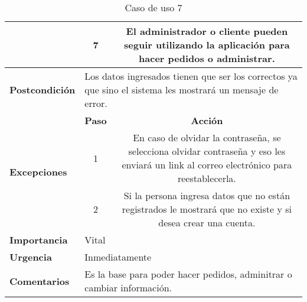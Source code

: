 \documentclass[conference]{IEEEtran}
\begin{document}
\begin{table}[H]
\begin{adjustbox}{width=0.45\textwidth}
\begin{tabular}{|p{11.215em}|p{5.355em}|c|}
\cmidrule{2-3}    \multicolumn{1}{|c|}{} & \multicolumn{1}{c|}{7} & \multicolumn{1}{p{32em}|}{El administrador o cliente pueden seguir utilizando la aplicación para hacer pedidos o administrar.} \\
    \midrule
    \textbf{Postcondición} & \multicolumn{2}{p{37.355em}|}{Los datos ingresados tienen que ser los correctos ya que sino el sistema les mostrará un mensaje de error.} \\
    \midrule
    \multirow{4}[6]{*}{\textbf{Excepciones}} & \textbf{Paso} & \multicolumn{1}{p{32em}|}{\textbf{Acción}} \\
\cmidrule{2-3}    \multicolumn{1}{|c|}{} & \multicolumn{1}{c|}{\multirow{2}[2]{*}{1}} & \multicolumn{1}{c|}{\multirow{2}[2]{*}{En caso de olvidar la contraseña, se selecciona olvidar contraseña y eso les enviará un link al correo electrónico para reestablecerla.}} \\
    \multicolumn{1}{|c|}{} & \multicolumn{1}{c|}{} &  \\
\cmidrule{2-3}    \multicolumn{1}{|c|}{} & \multicolumn{1}{c|}{2} & \multicolumn{1}{p{32em}|}{Si la persona ingresa datos que no están registrados le mostrará que no existe y si desea crear una cuenta.} \\
    \midrule
    \textbf{Importancia} & \multicolumn{2}{p{37.355em}|}{Vital} \\
    \midrule
    \textbf{Urgencia} & \multicolumn{2}{p{37.355em}|}{Inmediatamente} \\
    \midrule
    \textbf{Comentarios} & \multicolumn{2}{p{37.355em}|}{Es la base para poder hacer pedidos, adminitrar o cambiar información.} \\
    \bottomrule
    \end{tabular}%
    \end{adjustbox}
    \vspace{0.2cm}
    \caption{Caso de uso 7}
  \label{tab:addlabel}%
\end{table}%
\end{document}
